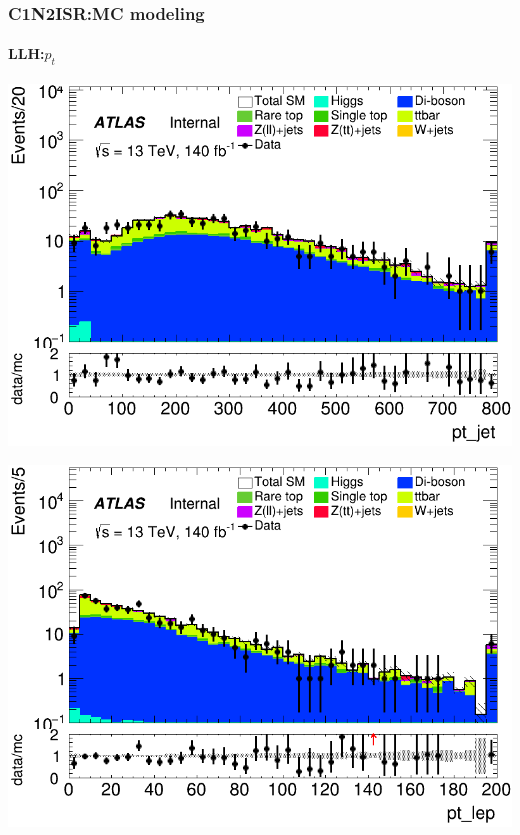\documentclass[usenames,dvipsnames]{beamer}
\begin{document}
\begin{frame}
\frametitle{C1N2ISR:MC modeling}
\framesubtitle{LLH:\quad $p_t$}
    \begin{minipage}{0.32\textwidth}
        \centering
        \includegraphics[width=\textwidth]{graphics/LLH_met/LLH_met_pt_jet.png}
    \end{minipage}
    \hfill
    \begin{minipage}{0.32\textwidth}
        \centering
        \includegraphics[width=\textwidth]{graphics/LLH_met/LLH_met_pt_lep.png}
    \end{minipage}
    \hfill
    \begin{minipage}{0.32\textwidth}
        \centering

\end{minipage}
\end{frame}
\end{document}
